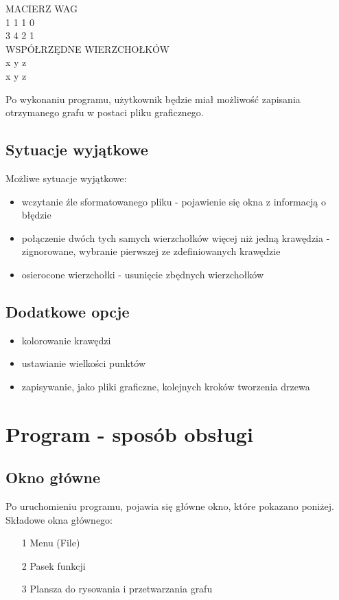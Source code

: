 \documentclass[paper=a4, fontsize=11pt]{scrartcl} %
\numberwithin{equation}{section} %
\numberwithin{figure}{section} %
\numberwithin{table}{section} %
\begin{document}
\begin{center}
MACIERZ WAG \\

1 1 1 0 \\
3 4 2 1 \\

WSPÓŁRZĘDNE WIERZCHOŁKÓW \\
x y z \\
x y z
\end{center}

Po wykonaniu programu, użytkownik będzie miał możliwość zapisania otrzymanego grafu w postaci pliku graficznego.

\subsection{Sytuacje wyjątkowe}   

Możliwe sytuacje wyjątkowe:
\begin{itemize}
\item wczytanie źle sformatowanego pliku - pojawienie się okna z informacją o błędzie
\item połączenie dwóch tych samych wierzchołków więcej niż jedną krawędzia - zignorowane, wybranie pierwszej ze zdefiniowanych krawędzie
\item osierocone wierzchołki - usunięcie zbędnych wierzchołków
\end{itemize}

\subsection{Dodatkowe opcje}   

\begin{itemize}
\item kolorowanie krawędzi
\item ustawianie wielkości punktów
\item zapisywanie, jako pliki graficzne, kolejnych kroków tworzenia drzewa
\end{itemize}

\section{Program - sposób obsługi}

\subsection{Okno główne}

Po uruchomieniu programu, pojawia się główne okno, które pokazano poniżej. Składowe okna głównego:
\begin{itemize}
\item[1] Menu (File)
\item[2] Pasek funkcji
\item[3] Plansza do rysowania i przetwarzania grafu
\end{itemize}
\end{document}

